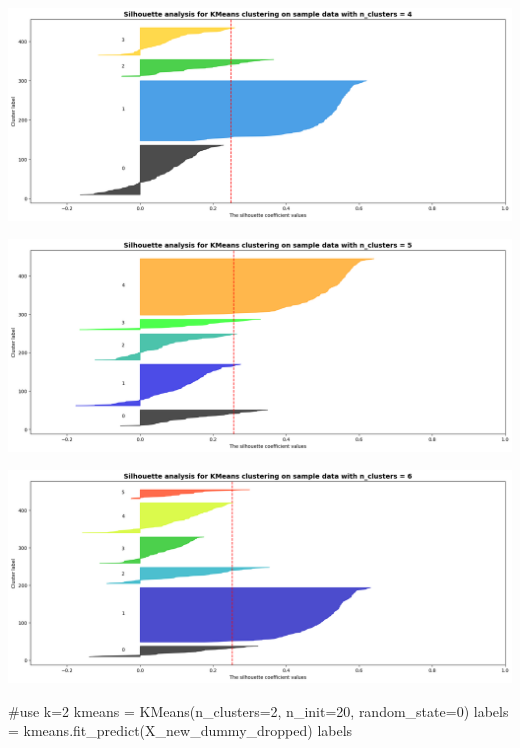 \documentclass[
  11pt,
  letterpaper,
  DIV=11,
  numbers=noendperiod]{scrartcl}
\newenvironment{Shaded}{\begin{snugshade}}{\end{snugshade}}
\newcommand{\CommentTok}[1]{\textcolor[rgb]{0.37,0.37,0.37}{#1}}
\newcommand{\DecValTok}[1]{\textcolor[rgb]{0.68,0.00,0.00}{#1}}
\newcommand{\NormalTok}[1]{\textcolor[rgb]{0.00,0.23,0.31}{#1}}
\newcommand{\OperatorTok}[1]{\textcolor[rgb]{0.37,0.37,0.37}{#1}}
\begin{document}
\includegraphics{assignment6111_files/figure-pdf/cell-29-output-3.png}

\includegraphics{assignment6111_files/figure-pdf/cell-29-output-4.png}

\includegraphics{assignment6111_files/figure-pdf/cell-29-output-5.png}

\begin{Shaded}
\begin{Highlighting}[]
\CommentTok{\#use k=2}
\NormalTok{kmeans }\OperatorTok{=}\NormalTok{ KMeans(n\_clusters}\OperatorTok{=}\DecValTok{2}\NormalTok{, n\_init}\OperatorTok{=}\DecValTok{20}\NormalTok{, random\_state}\OperatorTok{=}\DecValTok{0}\NormalTok{)}
\NormalTok{labels }\OperatorTok{=}\NormalTok{ kmeans.fit\_predict(X\_new\_dummy\_dropped)}
\NormalTok{labels}
\end{Highlighting}
\end{Shaded}
\end{document}
